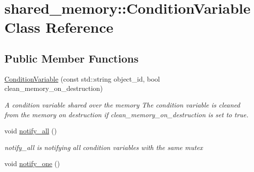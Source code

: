\hypertarget{classshared__memory_1_1ConditionVariable}{}\section{shared\+\_\+memory\+:\+:Condition\+Variable Class Reference}
\label{classshared__memory_1_1ConditionVariable}
\subsection*{Public Member Functions}
\begin{DoxyCompactItemize}
\item 
\hyperlink{classshared__memory_1_1ConditionVariable_ae4b6accfbe98b2e23f9e20789cea46f7}{Condition\+Variable} (const std\+::string object\+\_\+id, bool clean\+\_\+memory\+\_\+on\+\_\+destruction)\hypertarget{classshared__memory_1_1ConditionVariable_ae4b6accfbe98b2e23f9e20789cea46f7}{}\label{classshared__memory_1_1ConditionVariable_ae4b6accfbe98b2e23f9e20789cea46f7}

\begin{DoxyCompactList}\small\item\em A condition variable shared over the memory The condition variable is cleaned from the memory on destruction if clean\+\_\+memory\+\_\+on\+\_\+destruction is set to true. \end{DoxyCompactList}\item 
void \hyperlink{classshared__memory_1_1ConditionVariable_abc70cd1401f40e23ca4a6afb33f28bb5}{notify\+\_\+all} ()\hypertarget{classshared__memory_1_1ConditionVariable_abc70cd1401f40e23ca4a6afb33f28bb5}{}\label{classshared__memory_1_1ConditionVariable_abc70cd1401f40e23ca4a6afb33f28bb5}

\begin{DoxyCompactList}\small\item\em notify\+\_\+all is notifying all condition variables with the same mutex \end{DoxyCompactList}\item 
void \hyperlink{classshared__memory_1_1ConditionVariable_a8953b054a1074ab5ef0a9f9b35f58a42}{notify\+\_\+one} ()\hypertarget{classshared__memory_1_1ConditionVariable_a8953b054a1074ab5ef0a9f9b35f58a42}{}\label{classshared__memory_1_1ConditionVariable_a8953b054a1074ab5ef0a9f9b35f58a42}


\end{DoxyCompactItemize}
